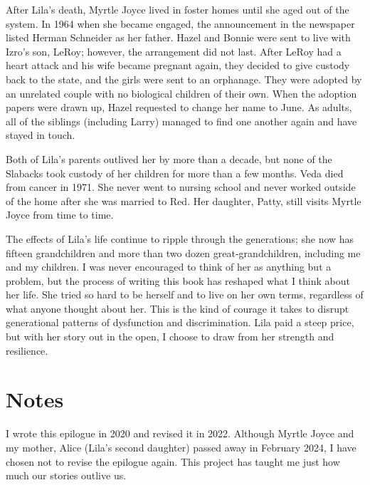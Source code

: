 \documentclass[
  letterpaper,
]{book}
\begin{document}
After Lila's death, Myrtle Joyce lived in foster homes until she aged
out of the system. In 1964 when she became engaged, the announcement in
the newspaper listed Herman Schneider as her father. Hazel and Bonnie
were sent to live with Izro's son, LeRoy; however, the arrangement did
not last. After LeRoy had a heart attack and his wife became pregnant
again, they decided to give custody back to the state, and the girls
were sent to an orphanage. They were adopted by an unrelated couple with
no biological children of their own. When the adoption papers were drawn
up, Hazel requested to change her name to June. As adults, all of the
siblings (including Larry) managed to find one another again and have
stayed in touch.

Both of Lila's parents outlived her by more than a decade, but none of
the Slabacks took custody of her children for more than a few months.
Veda died from cancer in 1971. She never went to nursing school and
never worked outside of the home after she was married to Red. Her
daughter, Patty, still visits Myrtle Joyce from time to time.

The effects of Lila's life continue to ripple through the generations;
she now has fifteen grandchildren and more than two dozen
great-grandchildren, including me and my children. I was never
encouraged to think of her as anything but a problem, but the process of
writing this book has reshaped what I think about her life. She tried so
hard to be herself and to live on her own terms, regardless of what
anyone thought about her. This is the kind of courage it takes to
disrupt generational patterns of dysfunction and discrimination. Lila
paid a steep price, but with her story out in the open, I choose to draw
from her strength and resilience.

\section{Notes}\label{notes-60}

I wrote this epilogue in 2020 and revised it in 2022. Although Myrtle
Joyce and my mother, Alice (Lila's second daughter) passed away in
February 2024, I have chosen not to revise the epilogue again. This
project has taught me just how much our stories outlive us.
\end{document}
